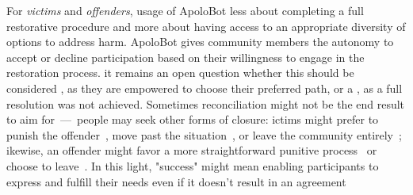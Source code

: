 For \textit{victims} and \textit{offenders},   usage of ApoloBot  less about completing a full restorative procedure and more about having access to an appropriate diversity of options to address harm. ApoloBot gives community members the autonomy to accept or decline participation based on their willingness to engage in the restoration process.  it remains an open question whether this should be considered , as they are empowered to choose their preferred path, or a , as a full resolution was not achieved. Sometimes reconciliation might not be the end result to aim for~---~people may seek other forms of closure: ictims might prefer to punish the offender~\cite{Xiao2022, Aliyu2024}, move past the situation~\cite{Xiao2023}, or leave the community entirely~\cite{Thomas2022}; ikewise, an offender might favor a more straightforward punitive process~\cite{Xiao2023} or choose to leave~\cite{Gao2024}. In this light, "success" might mean enabling participants to express and fulfill their needs even if it doesn't result in an agreement


